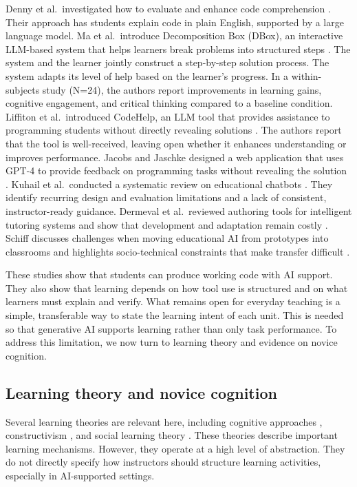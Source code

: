 \documentclass{article}
\begin{document}
%
Denny et al.\ investigated how to evaluate and enhance code comprehension \citep{DennyEtAl2024EiPE}. Their approach has students explain code in plain English, supported by a large language model.
Ma et al.\ introduce Decomposition Box (DBox), an interactive LLM-based system that helps learners break problems into structured steps \citep{MaEtAl2025DBox}. The system and the learner jointly construct a step-by-step solution process. The system adapts its level of help based on the learner's progress. In a within-subjects study (N=24), the authors report improvements in learning gains, cognitive engagement, and critical thinking compared to a baseline condition.
Liffiton et al.\ introduced CodeHelp, an LLM tool that provides assistance to programming students without directly revealing solutions \citep{LiffitonEtAl2023CodeHelp}. The authors report that the tool is well-received, leaving open whether it enhances understanding or improves performance.
Jacobs and Jaschke designed a web application that uses GPT-4 to provide feedback on programming tasks without revealing the solution \citep{JacobsJaschke2024LLMFeedback}.
%
Kuhail et al.\ conducted a systematic review on educational chatbots \citep{KuhailEtAl2023EducationalChatbotsSLR}. They identify recurring design and evaluation limitations and a lack of consistent, instructor-ready guidance.
%
Dermeval et al.\ reviewed authoring tools for intelligent tutoring systems and show that development and adaptation remain costly \citep{DermevalEtAl2018ITSAuthoringToolsSLR}. Schiff discusses challenges when moving educational AI from prototypes into classrooms and highlights socio-technical constraints that make transfer difficult \citep{Schiff2021OutOfLab}.

These studies show that students can produce working code with AI support. They also show that learning depends on how tool use is structured and on what learners must explain and verify. What remains open for everyday teaching is a simple, transferable way to state the learning intent of each unit. This is needed so that generative AI supports learning rather than only task performance. To address this limitation, we now turn to learning theory and evidence on novice cognition.\par

\subsection{Learning theory and novice cognition}
Several learning theories are relevant here, including cognitive approaches \citep{NRC1999HowPeopleLearn}, constructivism \citep{Glasersfeld1989Constructivism}, and social learning theory \citep{Bandura1977SocialLearning}. These theories describe important learning mechanisms. However, they operate at a high level of abstraction. They do not directly specify how instructors should structure learning activities, especially in AI-supported settings.
\end{document}
